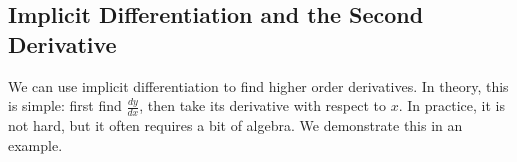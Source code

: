 %
%
%
%
%
%
%
%

\subsection*{Implicit Differentiation and the Second Derivative}

We can use implicit differentiation to find higher order derivatives. In theory, this is simple: first find $\frac{dy}{dx}$, then take its derivative with respect to $x$. In practice, it is not hard, but it often requires a bit of algebra. We demonstrate this in an example.\\

